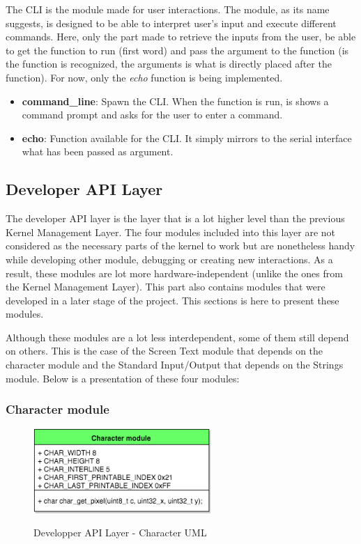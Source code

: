 The CLI is the module made for user interactions. The module, as its name suggests, is designed to be able to interpret user's input and execute different commands. Here, only the part made to retrieve the inputs from the user, be able to get the function to run (first word) and pass the argument to the function (is the function is recognized, the arguments is what is directly placed after the function). For now, only the \textit{echo} function is being implemented.
\begin{itemize}
	\item \textbf{command\_line}: Spawn the CLI. When the function is run, is shows a command prompt and asks for the user to enter a command. 
	\item \textbf{echo}: Function available for the CLI. It simply mirrors to the serial interface what has been passed as argument.
\end{itemize}

\pagebreak



\subsection{Developer API Layer}
The developer API layer is the layer that is a lot higher level than the previous Kernel Management Layer. The four modules included into this layer are not considered as the necessary parts of the kernel to work but are nonetheless handy while developing other module, debugging or creating new interactions. As a result, these modules are lot more hardware-independent (unlike the ones from the Kernel Management Layer). This part also contains modules that were developed in a later stage of the project. This sections is here to present these modules.

Although these modules are a lot less interdependent, some of them still depend on others. This is the case of the Screen Text module that depends on the character module and the Standard Input/Output that depends on the Strings module.
Below is a presentation of these four modules: 




\subsubsection{Character module}

\begin{figure}[H]
\begin{center}
\includegraphics[width=0.6\textwidth]{includes/figures/chapter5_developper_api_layer_char_UML.png}  \\
\caption{Developper API Layer - Character UML}
\end{center}
\label{fig:chapter5_developper_api_layer_char_UML}
\end{figure}

